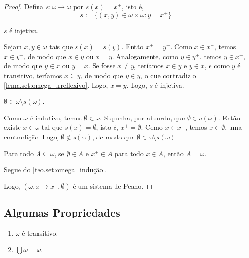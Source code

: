 \begin{proof}
    Defina $s : \omega \to \omega$ por $s(x) = x^+$, isto é,
        \[
            s := \{(x,y) \in \omega \times \omega : y = x^+ \}.
        \]
        \begin{claim}
            $s$ é injetiva.
        \end{claim}
        \begin{midproof}
            Sejam $x,y \in \omega$ tais que $s(x)=s(y)$. Então $x^+ = y^+$. Como $x \in x^+$, temos $x \in y^+$, de modo que $x \in y$ ou $x=y$. Analogamente, como $y \in y^+$, temos $y \in x^+$, de modo que $y \in x$ ou $y=x$. Se fosse $x \neq y$, teríamos $x \in y$ e $y \in x$, e como $y$ é transitivo, teríamos $x \subseteq y$, de modo que $y \in y$, o que contradiz o \cref{lema.set:omega_irreflexivo}. Logo, $x=y$. Logo, $s$ é injetiva. \whiteproof
        \end{midproof}
        \begin{claim}
            $\emptyset \in \omega \setminus s(\omega)$.
        \end{claim}
        \begin{midproof}
            Como $\omega$ é indutivo, temos $\emptyset \in \omega$. Suponha, por absurdo, que $\emptyset \in s(\omega)$. Então existe $x \in \omega$ tal que $s(x)=\emptyset$, isto é, $x^+=\emptyset$. Como $x \in x^+$, temos $x \in \emptyset$, uma contradição. Logo, $\emptyset \notin s(\omega)$, de modo que $\emptyset \in \omega \setminus s(\omega)$. \whiteproof
        \end{midproof}
        \begin{claim}
            Para todo $A \subseteq \omega$, se $\emptyset \in A$ e $x^+ \in A$ para todo $x \in A$, então $A = \omega$.
        \end{claim}
        \begin{midproof}
            Segue do \cref{teo.set:omega_indução}. \whiteproof
        \end{midproof}
    Logo, $(\omega, x \mapsto x^+, \emptyset)$ é um sistema de Peano. \blackproof
\end{proof}

\subsection*{Algumas Propriedades}

\begin{theorem} \label{cor.set:bigcupomega}
    \leavevmode
        \begin{enumerate}[leftmargin=*, align=left, label=\textbf{(\alph*)}]
            \item $\omega$ é transitivo.
            \item $\bigcup \omega = \omega$.
        \end{enumerate}
\end{theorem}

